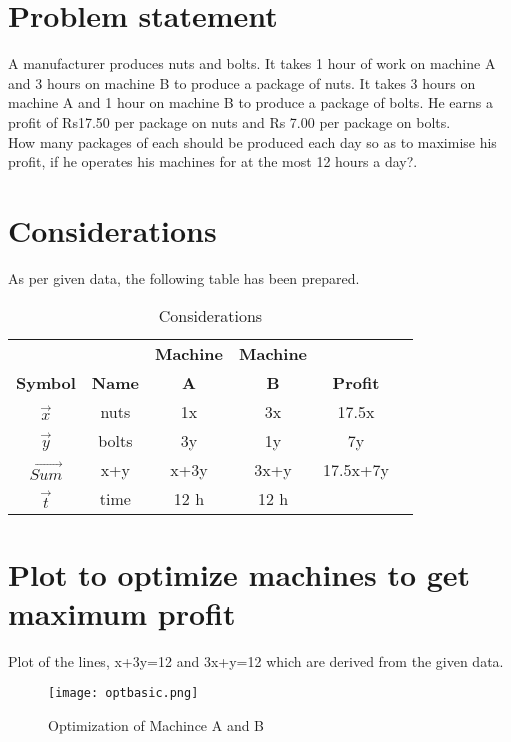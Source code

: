 \documentclass[journal,10pt,twocolumn]{article}
\begin{document}
\section{Problem statement}
A manufacturer produces nuts and bolts. It takes 1 hour of work on machine A
and 3 hours on machine B to produce a package of nuts. It takes 3 hours on
machine A and 1 hour on machine B to produce a package of bolts. He earns a
profit of Rs17.50 per package on nuts and Rs 7.00 per package on bolts.\\
How many packages of each should be produced each day so as to maximise his
profit, if he operates his machines for at the most 12 hours a day?.
\section{Considerations}

\vspace{0.2cm}
\begin{flushleft}
As per given data, the following table has been prepared.\\
\end{flushleft}
\vspace{0.3cm}
\begin{table}[htbp]
    \centering
\setlength\extrarowheight{2pt}
\begin{tabular}{|c|c|c|c|c|c|} \hline
&  &\textbf{Machine}&\textbf{Machine}& \\
	\textbf{Symbol} & \textbf{Name} &\textbf{A}&\textbf{B}&\textbf{Profit}\\
	\hline
	$\vec{x}$ & nuts & 1x&3x & 17.5x\\  \hline
	$\vec{y}$ & bolts & 3y&1y & 7y\\ \hline
	$\vec{Sum}$ & x+y & x+3y& 3x+y & 17.5x+7y\\ \hline
	$\vec{t}$ & time & 12 h & 12 h & \\ \hline

\end{tabular}
\caption{\label{tab:widgets}Considerations}
\end{table}

\section{Plot to optimize machines to get maximum profit}
\vspace{0.25cm}
Plot of the lines, x+3y=12 and 3x+y=12 which are derived from the given data.
\begin{figure}[h]
\texttt{[image: optbasic.png]}
\caption{Optimization of Machince A and B}
\label{Optimization of Machince A and B}
\end{figure}
\end{document}
